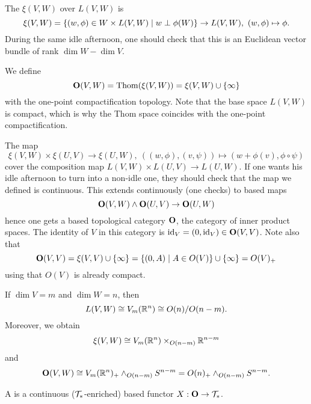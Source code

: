 The  $\xi(V,W)$ over $L(V,W)$ is
\[\xi(V,W)=\cb{(w,\phi)\in W\times L(V,W)\mid w\perp\phi(W)}\to L(V,W),\ (w,\phi)\mapsto\phi.\]
During the same idle afternoon, one should check that this is an Euclidean vector bundle of rank $\dim W-\dim V$.

We define
\[\boldsymbol{\mathrm{O}}(V,W)=\operatorname{Thom}(\xi(V,W))=\xi(V,W)\cup\{\infty\}\]
with the one-point compactification topology. Note that the base space $L(V,W)$ is compact, which is why the Thom space coincides with the one-point compactification.

The map
\[\xi(V,W)\times\xi(U,V)\to\xi(U,W),\ ((w,\phi),(v,\psi))\mapsto(w+\phi(v),\phi\circ\psi)\]
cover the composition map $L(V,W)\times L(U,V)\to L(U,W)$. If one wants his idle afternoon to turn into a non-idle one, they should check that the map we defined is continuous. This extends continuously (one checks) to based maps
\[\boldsymbol{\mathrm{O}}(V,W)\wedge\boldsymbol{\mathrm{O}}(U,V)\to\boldsymbol{\mathrm{O}}(U,W)\]
hence one gets a based topological category $\boldsymbol{\mathrm{O}}$, the category of inner product spaces. The identity of $V$ in this category is $\operatorname{id}_V=(0,\operatorname{id}_V)\in\boldsymbol{\mathrm{O}}(V,V)$. Note also that
\[\boldsymbol{\mathrm{O}}(V,V)=\xi(V,V)\cup\{\infty\}=\{(0,A)\mid A\in O(V)\}\cup\{\infty\}=O(V)_+\]
using that $O(V)$ is already compact.

\begin{remark}
If $\dim{V} = m$ and $\dim{W} = n$, then
\[ L(V,W) \cong V_m({\mathbb R}^n) \cong O(n)/O(n-m). \]
Moreover, we obtain
\[ \xi(V,W) \cong V_m({\mathbb R}^n) \times_{O(n-m)} {\mathbb R}^{n-m} \]
and
\[ \boldsymbol{\mathrm{O}}(V,W) \cong V_m({\mathbb R}^n)_+ \wedge_{O(n-m)} S^{n-m} = O(n)_+ \wedge_{O(n-m)} S^{n-m}.\]
\end{remark}

\begin{definition!}
A  is a continuous ($\mathcal{T}_*$-enriched) based functor $X:\boldsymbol{\mathrm{O}}\to\mathcal{T}_*$.
\end{definition!}

